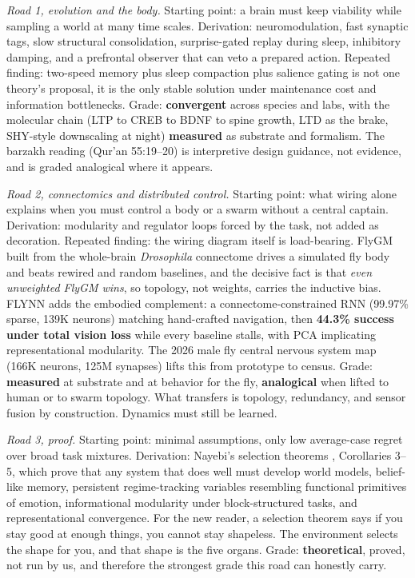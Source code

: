 \textit{Road 1, evolution and the body.} Starting point: a brain must keep viability while sampling a world at many time scales. Derivation: neuromodulation, fast synaptic tags, slow structural consolidation, surprise-gated replay during sleep, inhibitory damping, and a prefrontal observer that can veto a prepared action. Repeated finding: two-speed memory plus sleep compaction plus salience gating is not one theory's proposal, it is the only stable solution under maintenance cost and information bottlenecks. Grade: \textbf{convergent} across species and labs, with the molecular chain (LTP to CREB to BDNF to spine growth, LTD as the brake, SHY-style downscaling at night) \textbf{measured} as substrate and formalism. The barzakh reading (Qur'an 55:19--20) is interpretive design guidance, not evidence, and is graded analogical where it appears.

\textit{Road 2, connectomics and distributed control.} Starting point: what wiring alone explains when you must control a body or a swarm without a central captain. Derivation: modularity and regulator loops forced by the task, not added as decoration. Repeated finding: the wiring diagram itself is load-bearing. FlyGM \cite{flygm2026} built from the whole-brain \textit{Drosophila} connectome drives a simulated fly body and beats rewired and random baselines, and the decisive fact is that \emph{even unweighted FlyGM wins}, so topology, not weights, carries the inductive bias. FLYNN \cite{flynn2026} adds the embodied complement: a connectome-constrained RNN (99.97\% sparse, 139K neurons) matching hand-crafted navigation, then \textbf{44.3\% success under total vision loss} while every baseline stalls, with PCA implicating representational modularity. The 2026 male fly central nervous system map (166K neurons, 125M synapses) lifts this from prototype to census. Grade: \textbf{measured} at substrate and at behavior for the fly, \textbf{analogical} when lifted to human or to swarm topology. What transfers is topology, redundancy, and sensor fusion by construction. Dynamics must still be learned.

\textit{Road 3, proof.} Starting point: minimal assumptions, only low average-case regret over broad task mixtures. Derivation: Nayebi's selection theorems \cite{nayebi2026}, Corollaries 3--5, which prove that any system that does well must develop world models, belief-like memory, persistent regime-tracking variables resembling functional primitives of emotion, informational modularity under block-structured tasks, and representational convergence. For the new reader, a selection theorem says if you stay good at enough things, you cannot stay shapeless. The environment selects the shape for you, and that shape is the five organs. Grade: \textbf{theoretical}, proved, not run by us, and therefore the strongest grade this road can honestly carry.

